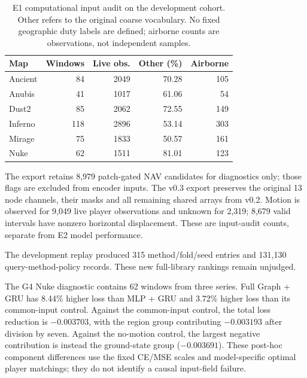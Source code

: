 \begin{table}[t]
\caption{E1 computational input audit on the development cohort. Other refers to the original coarse vocabulary. No fixed geographic duty labels are defined; airborne counts are observations, not independent samples.}
\label{tab:inputaudit}
\centering\small
\setlength{\tabcolsep}{3pt}
\begin{tabular}{lrrrr}
\toprule
Map & Windows & Live obs. & Other (\%) & Airborne\\
\midrule
Ancient & 84 & 2049 & 70.28 & 105 \\ %
Anubis & 41 & 1017 & 61.06 & 54 \\ %
Dust2 & 85 & 2062 & 72.55 & 149 \\ %
Inferno & 118 & 2896 & 53.14 & 303 \\ %
Mirage & 75 & 1833 & 50.57 & 161 \\ %
Nuke & 62 & 1511 & 81.01 & 123 \\ %
\bottomrule
\end{tabular}
\end{table}
The export retains 8,979 patch-gated NAV candidates for diagnostics only; those flags are excluded from encoder inputs. The v0.3 export preserves the original 13 node channels, their masks and all remaining shared arrays from v0.2. Motion is observed for 9,049 live player observations and unknown for 2,319; 8,679 valid intervals have nonzero horizontal displacement. These are input-audit counts, separate from E2 model performance. %

The development replay produced 315 method/fold/seed entries and 131,130 query-method-policy records. These new full-library rankings remain unjudged. %

The G4 Nuke diagnostic contains 62 windows from three series. Full Graph + GRU has 8.44\% higher loss than MLP + GRU and 3.72\% higher loss than its common-input control. Against the common-input control, the total loss reduction is $-0.003703$, with the region group contributing $-0.003193$ after division by seven. Against the no-motion control, the largest negative contribution is instead the ground-state group ($-0.003691$). These post-hoc component differences use the fixed CE/MSE scales and model-specific optimal player matchings; they do not identify a causal input-field failure. %

